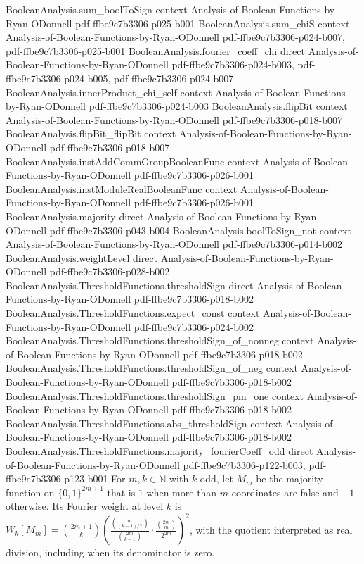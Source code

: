 \begin{lemma}
\proofstep
  {BooleanAnalysis.sum_boolToSign}
  {context}
  {Analysis-of-Boolean-Functions-by-Ryan-ODonnell}
  {pdf-ffbe9c7b3306-p025-b001}
\proofstep
  {BooleanAnalysis.sum_chiS}
  {context}
  {Analysis-of-Boolean-Functions-by-Ryan-ODonnell}
  {pdf-ffbe9c7b3306-p024-b007,
    pdf-ffbe9c7b3306-p025-b001}
\proofstep
  {BooleanAnalysis.fourier_coeff_chi}
  {direct}
  {Analysis-of-Boolean-Functions-by-Ryan-ODonnell}
  {pdf-ffbe9c7b3306-p024-b003,
    pdf-ffbe9c7b3306-p024-b005,
    pdf-ffbe9c7b3306-p024-b007}
\proofstep
  {BooleanAnalysis.innerProduct_chi_self}
  {context}
  {Analysis-of-Boolean-Functions-by-Ryan-ODonnell}
  {pdf-ffbe9c7b3306-p024-b003}
\proofstep
  {BooleanAnalysis.flipBit}
  {context}
  {Analysis-of-Boolean-Functions-by-Ryan-ODonnell}
  {pdf-ffbe9c7b3306-p018-b007}
\proofstep
  {BooleanAnalysis.flipBit_flipBit}
  {context}
  {Analysis-of-Boolean-Functions-by-Ryan-ODonnell}
  {pdf-ffbe9c7b3306-p018-b007}
\proofstep
  {BooleanAnalysis.instAddCommGroupBooleanFunc}
  {context}
  {Analysis-of-Boolean-Functions-by-Ryan-ODonnell}
  {pdf-ffbe9c7b3306-p026-b001}
\proofstep
  {BooleanAnalysis.instModuleRealBooleanFunc}
  {context}
  {Analysis-of-Boolean-Functions-by-Ryan-ODonnell}
  {pdf-ffbe9c7b3306-p026-b001}
\proofstep
  {BooleanAnalysis.majority}
  {direct}
  {Analysis-of-Boolean-Functions-by-Ryan-ODonnell}
  {pdf-ffbe9c7b3306-p043-b004}
\proofstep
  {BooleanAnalysis.boolToSign_not}
  {context}
  {Analysis-of-Boolean-Functions-by-Ryan-ODonnell}
  {pdf-ffbe9c7b3306-p014-b002}
\proofstep
  {BooleanAnalysis.weightLevel}
  {direct}
  {Analysis-of-Boolean-Functions-by-Ryan-ODonnell}
  {pdf-ffbe9c7b3306-p028-b002}
\proofstep
  {BooleanAnalysis.ThresholdFunctions.thresholdSign}
  {direct}
  {Analysis-of-Boolean-Functions-by-Ryan-ODonnell}
  {pdf-ffbe9c7b3306-p018-b002}
\proofstep
  {BooleanAnalysis.ThresholdFunctions.expect_const}
  {context}
  {Analysis-of-Boolean-Functions-by-Ryan-ODonnell}
  {pdf-ffbe9c7b3306-p024-b002}
\proofstep
  {BooleanAnalysis.ThresholdFunctions.thresholdSign_of_nonneg}
  {context}
  {Analysis-of-Boolean-Functions-by-Ryan-ODonnell}
  {pdf-ffbe9c7b3306-p018-b002}
\proofstep
  {BooleanAnalysis.ThresholdFunctions.thresholdSign_of_neg}
  {context}
  {Analysis-of-Boolean-Functions-by-Ryan-ODonnell}
  {pdf-ffbe9c7b3306-p018-b002}
\proofstep
  {BooleanAnalysis.ThresholdFunctions.thresholdSign_pm_one}
  {context}
  {Analysis-of-Boolean-Functions-by-Ryan-ODonnell}
  {pdf-ffbe9c7b3306-p018-b002}
\proofstep
  {BooleanAnalysis.ThresholdFunctions.abs_thresholdSign}
  {context}
  {Analysis-of-Boolean-Functions-by-Ryan-ODonnell}
  {pdf-ffbe9c7b3306-p018-b002}
\proofstep
  {BooleanAnalysis.ThresholdFunctions.majority_fourierCoeff_odd}
  {direct}
  {Analysis-of-Boolean-Functions-by-Ryan-ODonnell}
  {pdf-ffbe9c7b3306-p122-b003,
    pdf-ffbe9c7b3306-p123-b001}
For $m,k\in\mathbb N$ with $k$ odd, let $M_m$ be the majority function on
$\{0,1\}^{2m+1}$ that is $1$ when more than $m$ coordinates are false and $-1$
otherwise. Its Fourier weight at level $k$ is $\displaystyle
W_k[M_m]=\binom{2m+1}{k}\left(\frac{\binom{m}{(k-1)/2}}{\binom{2m}{k-1}}\cdot\frac{\binom{2m}{m}}{2^{2m}}\right)^2$,
with the quotient interpreted as real division, including when its denominator is zero.
\end{lemma}

